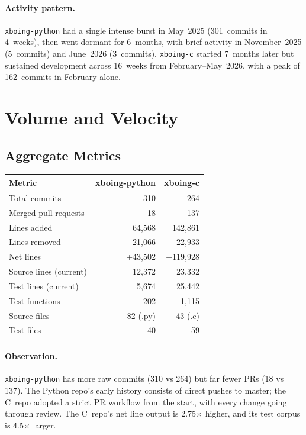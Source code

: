 \documentclass[a4paper,10pt]{article}
\newcommand{\repo}[1]{\texttt{#1}}
\begin{document}
\paragraph{Activity pattern.}
\repo{xboing-python} had a single intense burst in May~2025
(301~commits in 4~weeks), then went dormant for 6~months, with brief
activity in November~2025 (5~commits) and June~2026 (3~commits).
\repo{xboing-c} started 7~months later but sustained development
across 16~weeks from February--May~2026, with a peak of 162~commits
in February alone.

\section{Volume and Velocity}

\subsection{Aggregate Metrics}

\begin{center}
\begin{tabular}{@{}lrr@{}}
\toprule
\textbf{Metric} & \textbf{xboing-python} & \textbf{xboing-c} \\
\midrule
Total commits & 310 & 264 \\
Merged pull requests & 18 & 137 \\
Lines added & 64,568 & 142,861 \\
Lines removed & 21,066 & 22,933 \\
Net lines & +43,502 & +119,928 \\
Source lines (current) & 12,372 & 23,332 \\
Test lines (current) & 5,674 & 25,442 \\
Test functions & 202 & 1,115 \\
Source files & 82 (.py) & 43 (.c) \\
Test files & 40 & 59 \\
\bottomrule
\end{tabular}
\end{center}

\paragraph{Observation.}  \repo{xboing-python} has more raw commits
(310 vs 264) but far fewer PRs (18 vs 137).  The Python repo's early
history consists of direct pushes to master; the C~repo adopted a
strict PR workflow from the start, with every change going through
review.  The C~repo's net line output is 2.75$\times$ higher, and its
test corpus is 4.5$\times$ larger.
\end{document}
